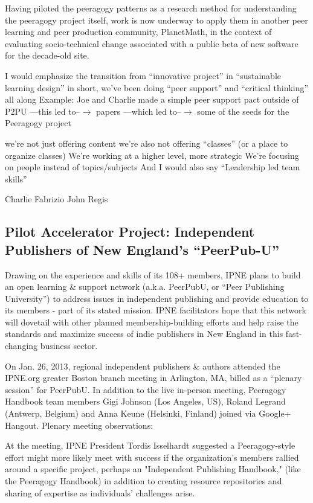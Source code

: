 \documentclass{acm_proc_article-sp}
\begin{document}
Having piloted the peeragogy patterns as a research method for understanding the peeragogy project itself, work is now underway to apply them in another peer learning and peer production community, PlanetMath, in the context of evaluating socio-technical change associated with a public beta of new software for the decade-old site.

I would emphasize the transition from ``innovative project'' in ``sustainable learning design'' in short, we've been doing ``peer support'' and ``critical thinking'' all along
Example: Joe and Charlie made a simple peer support pact outside of P2PU ---this led to--$\rightarrow$ papers ---which led to--$\rightarrow$ some of the seeds for the Peeragogy project

we're not just offering content
we're also not offering ``classes'' (or a place to organize classes)
We're working at a higher level, more strategic
We're focusing on people instead of topics/subjects
And I would also say ``Leadership led team skills''

Charlie
Fabrizio
John
Regis

\subsection{Pilot Accelerator Project: Independent Publishers of New England’s “PeerPub-U”}

Drawing on the experience and skills of its 108+ members, IPNE plans to build an open learning \& support network (a.k.a. PeerPubU, or “Peer Publishing University”) to address issues in independent publishing and provide education to its members - part of its stated mission. IPNE facilitators hope that this network will dovetail with other planned membership-building efforts and help raise the standards and maximize success of indie publishers in New England in this fast-changing business sector.

On Jan. 26, 2013, regional independent publishers \& authors attended the IPNE.org greater Boston branch meeting in Arlington, MA, billed as a “plenary session” for PeerPubU. In addition to the live in-person meeting, Peeragogy Handbook team members Gigi Johnson (Los Angeles, US), Roland Legrand (Antwerp, Belgium) and Anna Keune (Helsinki, Finland) joined via Google+ Hangout.
Plenary meeting observations:

At the meeting, IPNE President Tordis Isselhardt suggested a Peeragogy-style effort might more likely meet with success if the organization's members rallied around a specific project, perhaps an "Independent Publishing Handbook," (like the Peeragogy Handbook) in addition to creating resource repositories and sharing of expertise as individuals’ challenges arise.
\end{document}
